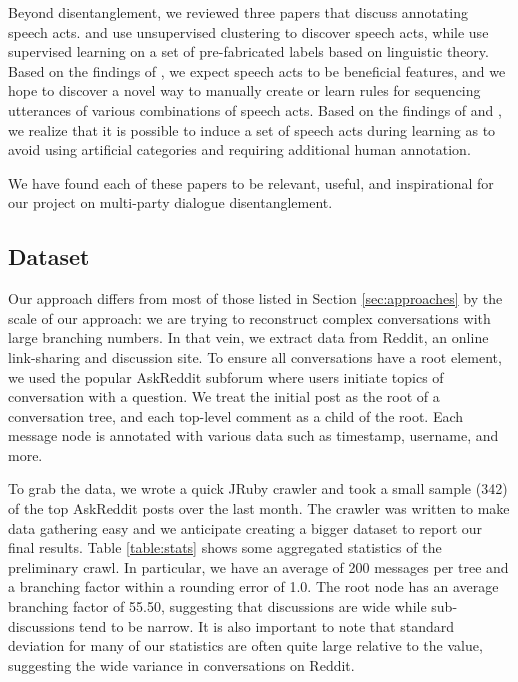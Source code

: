 \documentclass[10pt]{article}
\begin{document}
Beyond disentanglement, we reviewed three papers that discuss annotating 
speech acts. \cite{Ritter2010a} and \cite{Paula} use unsupervised clustering 
to discover speech acts, while \cite{Kim2012} use supervised learning on a set 
of pre-fabricated labels based on linguistic theory. Based on the findings of 
\cite{Kim2012}, we expect speech acts to be beneficial features, and we hope 
to discover a novel way to manually create or learn rules for sequencing 
utterances of various combinations of speech acts. Based on the findings of
\cite{Ritter2010a} and \cite{Paula}, we realize that it is possible to induce 
a set of speech acts during learning as to avoid using artificial categories 
and requiring additional human annotation.

We have found each of these papers to be relevant, useful, and inspirational
for our project on multi-party dialogue disentanglement.


\subsection{Dataset}
\label{section:dataset}
Our approach differs from most of those listed in Section \ref{sec:approaches}
by the scale of our approach: we are trying to reconstruct complex
conversations with large branching numbers.  In that vein, we extract data
from Reddit, an online link-sharing and discussion site. To ensure all
conversations have a root element, we used the popular AskReddit subforum
where users initiate topics of conversation with a question. We treat the
initial post as the root of a conversation tree, and each top-level comment as
a child of the root. Each message node is annotated with various data such as
timestamp, username, and more.

To grab the data, we wrote a quick JRuby crawler and took a small sample (342)
of the top AskReddit posts over the last month. The crawler was written to
make data gathering easy and we anticipate creating a bigger dataset to report
our final results. Table \ref{table:stats} shows some aggregated statistics of
the preliminary crawl. In particular, we have an average of 200 messages per
tree and a branching factor within a rounding error of 1.0. The root node has
an average branching factor of 55.50, suggesting that discussions are wide
while sub-discussions tend to be narrow. It is also important to note that
standard deviation for many of our statistics are often quite large relative
to the value, suggesting the wide variance in conversations on Reddit.
\end{document}
